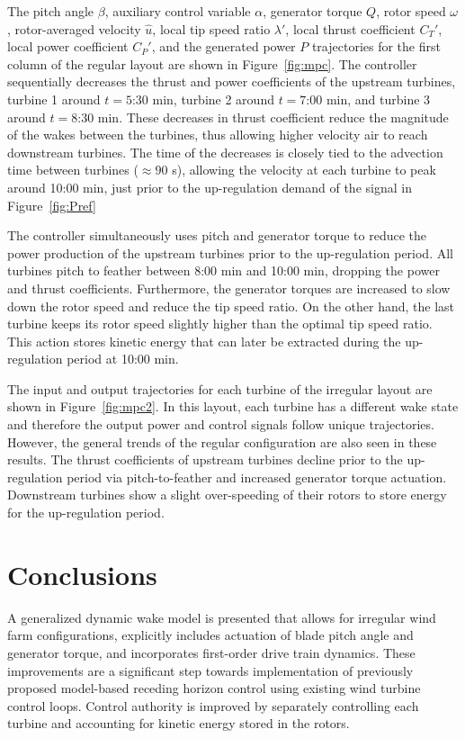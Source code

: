 The pitch angle $\beta$, auxiliary control variable $\alpha$, generator torque $Q$, rotor speed $\omega$, rotor-averaged velocity $\hat{u}$, local tip speed ratio $\lambda'$, local thrust coefficient $C_T'$, local power coefficient $C_P'$, and the generated power $P$ trajectories for the first column of the regular layout are shown in Figure~\ref{fig:mpc}. The controller sequentially decreases the thrust and power coefficients of the upstream turbines, turbine 1 around $t = 5$:30 min, turbine 2 around $t = 7$:00 min, and turbine 3 around $t = 8$:30 min. These decreases in thrust coefficient reduce the magnitude of the wakes between the turbines, thus allowing higher velocity air to reach downstream turbines. The time of the decreases is closely tied to the advection time between turbines ($\approx 90$ s), allowing the velocity at each turbine to peak around 10:00 min, just prior to the up-regulation demand of the signal in Figure~\ref{fig:Pref}

The controller simultaneously uses pitch and generator torque to reduce the power production of the upstream turbines prior to the up-regulation period. All turbines pitch to feather between 8:00 min and 10:00 min, dropping the power and thrust coefficients. Furthermore, the generator torques are increased to slow down the rotor speed and reduce the tip speed ratio. On the other hand, the last turbine keeps its rotor speed slightly higher than the optimal tip speed ratio. This action stores kinetic energy that can later be extracted during the up-regulation period at 10:00 min.

The input and output trajectories for each turbine of the irregular layout are shown in Figure~\ref{fig:mpc2}. In this layout, each turbine has a different wake state and therefore the output power and control signals follow unique trajectories. However, the general trends of the regular configuration are also seen in these results. The thrust coefficients of upstream turbines decline prior to the up-regulation period via pitch-to-feather and increased generator torque actuation. Downstream turbines show a slight over-speeding of their rotors to store energy for the up-regulation period.

\section{Conclusions}
\label{sec:rhc2-conclusions}
A generalized dynamic wake model is presented that allows for irregular wind farm configurations, explicitly includes actuation of blade pitch angle and generator torque, and incorporates first-order drive train dynamics. These improvements are a significant step towards implementation of previously proposed model-based receding horizon control using existing wind turbine control loops. Control authority is improved by separately controlling each turbine and accounting for kinetic energy stored in the rotors.

